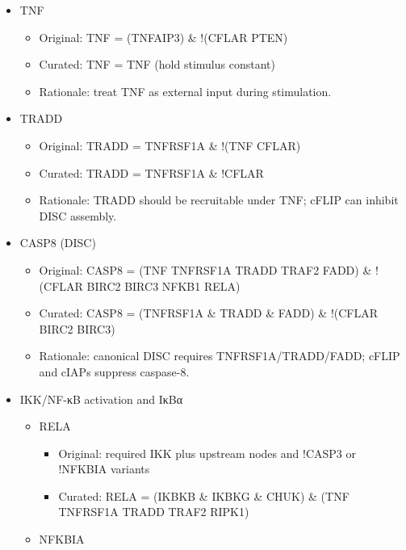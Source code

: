 \begin{itemize}
\tightlist
\item
  TNF

  \begin{itemize}
  \tightlist
  \item
    Original: TNF = (TNFAIP3) \& !(CFLAR \textbar{} PTEN)
  \item
    Curated: TNF = TNF (hold stimulus constant)
  \item
    Rationale: treat TNF as external input during stimulation.
  \end{itemize}
\item
  TRADD

  \begin{itemize}
  \tightlist
  \item
    Original: TRADD = TNFRSF1A \& !(TNF \textbar{} CFLAR)
  \item
    Curated: TRADD = TNFRSF1A \& !CFLAR
  \item
    Rationale: TRADD should be recruitable under TNF; cFLIP can inhibit
    DISC assembly.
  \end{itemize}
\item
  CASP8 (DISC)

  \begin{itemize}
  \tightlist
  \item
    Original: CASP8 = (TNF \textbar{} TNFRSF1A \textbar{} TRADD
    \textbar{} TRAF2 \textbar{} FADD) \& !(CFLAR \textbar{} BIRC2
    \textbar{} BIRC3 \textbar{} NFKB1 \textbar{} RELA)
  \item
    Curated: CASP8 = (TNFRSF1A \& TRADD \& FADD) \& !(CFLAR \textbar{}
    BIRC2 \textbar{} BIRC3)
  \item
    Rationale: canonical DISC requires TNFRSF1A/TRADD/FADD; cFLIP and
    cIAPs suppress caspase-8.
  \end{itemize}
\item
  IKK/NF-κB activation and IκBα

  \begin{itemize}
  \tightlist
  \item
    RELA

    \begin{itemize}
    \tightlist
    \item
      Original: required IKK plus upstream nodes and !CASP3 or !NFKBIA
      variants
    \item
      Curated: RELA = (IKBKB \& IKBKG \& CHUK) \& (TNF \textbar{}
      TNFRSF1A \textbar{} TRADD \textbar{} TRAF2 \textbar{} RIPK1)
    \end{itemize}
  \item
    NFKBIA


\end{itemize}
\end{itemize}

